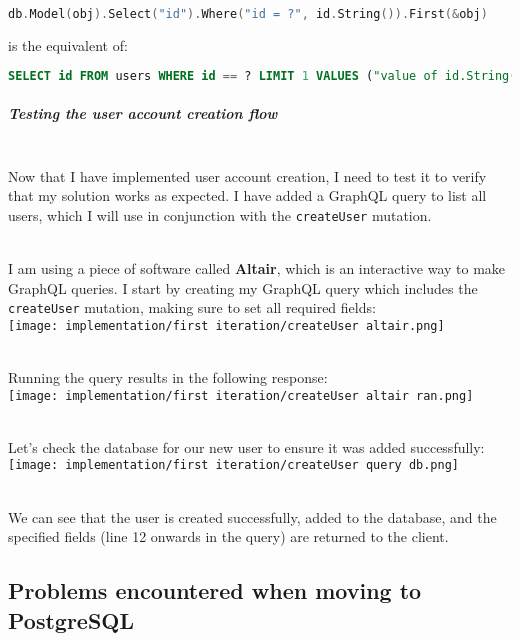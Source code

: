 \documentclass[../../main.tex]{subfiles}
\begin{document}
\begin{lstlisting}[language=Go]
        db.Model(obj).Select("id").Where("id = ?", id.String()).First(&obj)
    \end{lstlisting}

\noindent is the equivalent of:

\begin{lstlisting}[language=SQL]
        SELECT id FROM users WHERE id == ? LIMIT 1 VALUES ("value of id.String()")
    \end{lstlisting}

\subparagraph{Testing the user account creation flow}

\noindent \\ Now that I have implemented user account creation, I need to test it to verify that my solution works as expected. I have added a GraphQL query to list all users, which I will use in conjunction with the \lstinline{createUser} mutation.

\noindent \\ I am using a piece of software called \textbf{Altair}, which is an interactive way to make GraphQL queries. I start by creating my GraphQL query which includes the \lstinline{createUser} mutation, making sure to set all required fields:\\

\texttt{[image: implementation/first iteration/createUser altair.png]}

\noindent \\ Running the query results in the following response:\\

\texttt{[image: implementation/first iteration/createUser altair ran.png]}

\noindent \\ Let's check the database for our new user to ensure it was added successfully:\\

\texttt{[image: implementation/first iteration/createUser query db.png]}

\noindent \\ We can see that the user is created successfully, added to the database, and the specified fields (line 12 onwards in the query) are returned to the client.

\subsection{Problems encountered when moving to PostgreSQL}
\end{document}
